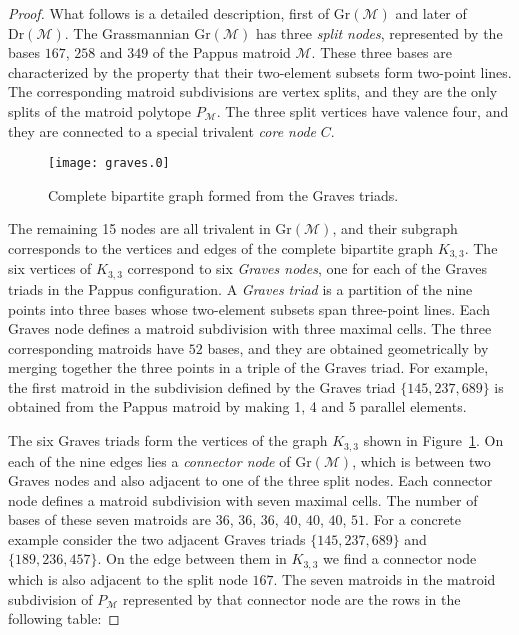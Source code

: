 \documentclass[12pt,a4paper]{amsart}
\theoremstyle{definition}
\newcommand{\Gr}{{\mathrm{Gr}}}
\newcommand{\Dr}{{\mathrm{Dr}}}
\providecommand\cM{{\mathscr{M}}}
\providecommand{\MatroidPolytope}[1]{P_{#1}}
\begin{document}
\begin{proof}
  What follows is a detailed description, first of $\Gr(\cM)$ and
  later of $\Dr(\cM)$.  The Grassmannian $\Gr(\cM)$ has three
  \emph{split nodes}, represented by the bases $167$, $258$ and $349$
  of the Pappus matroid $\cM$.  These three bases are characterized by
  the property that their two-element subsets form two-point lines.
  The corresponding matroid subdivisions are vertex splits, and they
  are the only splits of the matroid polytope $\MatroidPolytope{\cM}$.
  The three split vertices have valence four, and they are connected
  to a special trivalent \emph{core node} $C$.

  \begin{figure}[ht]\centering
    \texttt{[image: graves.0]}
    \caption{Complete bipartite graph formed from the Graves triads.}
    \label{fig:graves}
  \end{figure}

  The remaining 15 nodes are all trivalent in $\Gr(\cM)$, and their subgraph
  corresponds to the vertices and edges of the complete bipartite graph
  $K_{3,3}$. The six vertices of $K_{3,3}$ correspond to six \emph{Graves
    nodes}, one for each of the Graves triads in the Pappus configuration. A
  \emph{Graves triad} is a partition of the nine points into three bases whose
  two-element subsets span three-point lines.  Each Graves node defines a
  matroid subdivision with three maximal cells. The three corresponding
  matroids have $52$ bases, and they are obtained geometrically by merging
  together the three points in a triple of the Graves triad. For example, the
  first matroid in the subdivision defined by the Graves triad $\{145, 237,
  689\}$ is obtained from the Pappus matroid by making 1, 4 and 5 parallel
  elements.

  The six Graves triads form the vertices of the graph $K_{3,3}$ shown
  in Figure~\ref{fig:graves}.  On each of the nine edges lies a
  \emph{connector node} of $\Gr(\cM)$, which is between two Graves
  nodes and also adjacent to one of the three split nodes.  Each
  connector node defines a matroid subdivision with seven maximal
  cells.  The number of bases of these seven matroids are $36$, $36$,
  $36$, $40$, $40$, $40$, $51$.  For a concrete example consider the
  two adjacent Graves triads $\{145, 237, 689\}$ and $\{189, 236,
  457\}$. On the edge between them in $K_{3,3}$ we find a connector
  node which is also adjacent to the split node $167$. The seven
  matroids in the matroid subdivision of $\MatroidPolytope{\cM}$
  represented by that connector node are the rows in the following
  table:


\end{proof}
\end{document}
